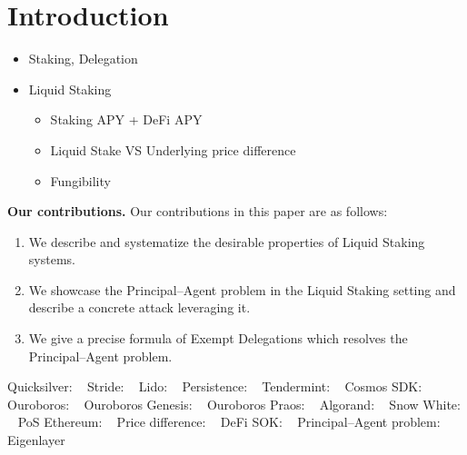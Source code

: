 \section{Introduction}

\begin{itemize}
    \item Staking, Delegation
    \item Liquid Staking
        \begin{itemize}
            \item Staking APY + DeFi APY
            \item Liquid Stake VS Underlying price difference 
            \item Fungibility
        \end{itemize}
\end{itemize}

\noindent
\textbf{Our contributions.} Our contributions in this paper are as follows:
\begin{enumerate}
    \item We describe and systematize the desirable properties of Liquid Staking systems.
    \item We showcase the Principal--Agent problem in the Liquid Staking setting and describe a concrete attack leveraging it.
    \item We give a precise formula of Exempt Delegations which resolves the Principal--Agent problem.
\end{enumerate}

Quicksilver: ~\cite{quicksilver}
Stride: ~\cite{stride}
Lido: ~\cite{lido}
Persistence: ~\cite{persistence}
Tendermint: ~\cite{2018tendermint, buchman2016tendermint}
Cosmos SDK: ~\cite{cosmossdk}
Ouroboros: ~\cite{ouroboros}
Ouroboros Genesis: ~\cite{ouroboros-genesis}
Ouroboros Praos: ~\cite{praos}
Algorand: ~\cite{algorand}
Snow White: ~\cite{DBLP:journals/iacr/BentovPS16a}
PoS Ethereum: ~\cite{casper,buterin2020combining,sompolinsky2015secure,kiayias2017trees}
Price difference: ~\cite{scharnowski2022liquid}
DeFi SOK: ~\cite{defi-sok}
Principal--Agent problem: ~\cite{jensen1976,wealthofnations}
Eigenlayer~\cite{eigenlayer}